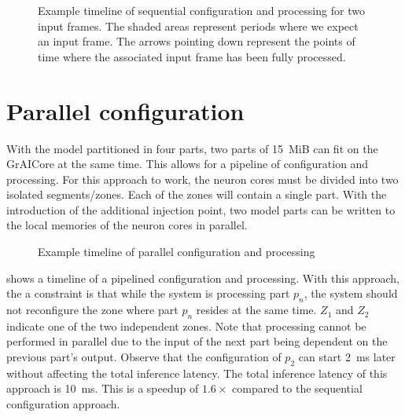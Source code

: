 \begin{figure}[hbtp]
    \centering
    \resizebox{1.0\linewidth}{!}{
        
    }
    \caption{
    Example timeline of sequential configuration and processing for two input frames.
    The shaded areas represent periods where we expect an input frame.
    The arrows pointing down represent the points of time where the associated input frame has been fully processed.
    }
    \label{fig:schedule_sequential_configuration_extended}
\end{figure}

\section{Parallel configuration}
With the model partitioned in four parts, two parts of \SI{15}{MiB} can fit on the GrAICore at the same time.
This allows for a pipeline of configuration and processing.
For this approach to work, the neuron cores must be divided into two isolated segments/zones.
Each of the zones will contain a single part.
With the introduction of the additional injection point, two model parts can be written to the local memories of the neuron cores in parallel.

\begin{figure}[hbtp]
    \centering
    \resizebox{0.65\linewidth}{!}{
        
    }
    \caption{Example timeline of parallel configuration and processing}
    \label{fig:schedule_parallel_configuration}
\end{figure}

 shows a timeline of a pipelined configuration and processing.
With this approach, the a constraint is that while the system is processing part $p_n$, the system should not reconfigure the zone where part $p_n$ resides at the same time.
$Z_1$ and $Z_2$ indicate one of the two independent zones.
Note that processing cannot be performed in parallel due to the input of the next part being dependent on the previous part's output.
Observe that the configuration of $p_2$ can start \SI{2}{ms} later without affecting the total inference latency.
The total inference latency of this approach is \SI{10}{ms}.
This is a speedup of $1.6\times$ compared to the sequential configuration approach.

